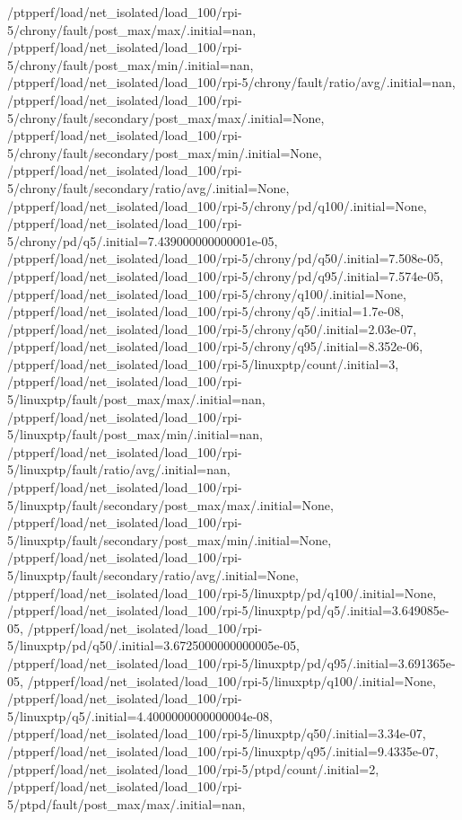{    /ptpperf/load/net_isolated/load_100/rpi-5/chrony/fault/post_max/max/.initial=nan,
    /ptpperf/load/net_isolated/load_100/rpi-5/chrony/fault/post_max/min/.initial=nan,
    /ptpperf/load/net_isolated/load_100/rpi-5/chrony/fault/ratio/avg/.initial=nan,
    /ptpperf/load/net_isolated/load_100/rpi-5/chrony/fault/secondary/post_max/max/.initial=None,
    /ptpperf/load/net_isolated/load_100/rpi-5/chrony/fault/secondary/post_max/min/.initial=None,
    /ptpperf/load/net_isolated/load_100/rpi-5/chrony/fault/secondary/ratio/avg/.initial=None,
    /ptpperf/load/net_isolated/load_100/rpi-5/chrony/pd/q100/.initial=None,
    /ptpperf/load/net_isolated/load_100/rpi-5/chrony/pd/q5/.initial=7.439000000000001e-05,
    /ptpperf/load/net_isolated/load_100/rpi-5/chrony/pd/q50/.initial=7.508e-05,
    /ptpperf/load/net_isolated/load_100/rpi-5/chrony/pd/q95/.initial=7.574e-05,
    /ptpperf/load/net_isolated/load_100/rpi-5/chrony/q100/.initial=None,
    /ptpperf/load/net_isolated/load_100/rpi-5/chrony/q5/.initial=1.7e-08,
    /ptpperf/load/net_isolated/load_100/rpi-5/chrony/q50/.initial=2.03e-07,
    /ptpperf/load/net_isolated/load_100/rpi-5/chrony/q95/.initial=8.352e-06,
    /ptpperf/load/net_isolated/load_100/rpi-5/linuxptp/count/.initial=3,
    /ptpperf/load/net_isolated/load_100/rpi-5/linuxptp/fault/post_max/max/.initial=nan,
    /ptpperf/load/net_isolated/load_100/rpi-5/linuxptp/fault/post_max/min/.initial=nan,
    /ptpperf/load/net_isolated/load_100/rpi-5/linuxptp/fault/ratio/avg/.initial=nan,
    /ptpperf/load/net_isolated/load_100/rpi-5/linuxptp/fault/secondary/post_max/max/.initial=None,
    /ptpperf/load/net_isolated/load_100/rpi-5/linuxptp/fault/secondary/post_max/min/.initial=None,
    /ptpperf/load/net_isolated/load_100/rpi-5/linuxptp/fault/secondary/ratio/avg/.initial=None,
    /ptpperf/load/net_isolated/load_100/rpi-5/linuxptp/pd/q100/.initial=None,
    /ptpperf/load/net_isolated/load_100/rpi-5/linuxptp/pd/q5/.initial=3.649085e-05,
    /ptpperf/load/net_isolated/load_100/rpi-5/linuxptp/pd/q50/.initial=3.6725000000000005e-05,
    /ptpperf/load/net_isolated/load_100/rpi-5/linuxptp/pd/q95/.initial=3.691365e-05,
    /ptpperf/load/net_isolated/load_100/rpi-5/linuxptp/q100/.initial=None,
    /ptpperf/load/net_isolated/load_100/rpi-5/linuxptp/q5/.initial=4.4000000000000004e-08,
    /ptpperf/load/net_isolated/load_100/rpi-5/linuxptp/q50/.initial=3.34e-07,
    /ptpperf/load/net_isolated/load_100/rpi-5/linuxptp/q95/.initial=9.4335e-07,
    /ptpperf/load/net_isolated/load_100/rpi-5/ptpd/count/.initial=2,
    /ptpperf/load/net_isolated/load_100/rpi-5/ptpd/fault/post_max/max/.initial=nan,
}

